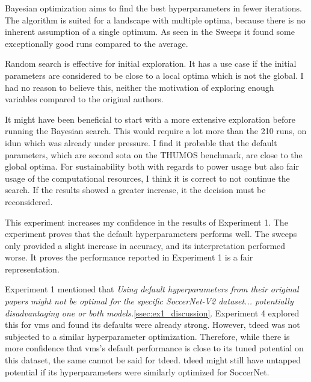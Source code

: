 Bayesian optimization aims to find the best hyperparameters in fewer iterations. The algorithm is suited for a landscape with multiple optima, because there is no inherent assumption of a single optimum. As seen in the Sweeps it found some exceptionally good runs compared to the average. 

Random search is effective for initial exploration. It has a use case if the initial parameters are considered to be close to a local optima which is not the global. I had no reason to believe this, neither the motivation of exploring enough variables compared to the original authors\cite{li_videomamba_2024}.


It might have been beneficial to start with a more extensive exploration before running the Bayesian search. This would require a lot more than the 210 runs, on \acrshort{idun} which was already under pressure. I find it probable that the default parameters, which are second \acrshort{sota} on the THUMOS benchmark, are close to the global optima. For sustainability both with regards to power usage but also fair usage of the computational resources, I think it is correct to not continue the search. If the results showed a greater increase, it the decision must be reconsidered.




This experiment increases my confidence in the results of Experiment 1. The experiment proves that the default hyperparameters performs well. The sweeps only provided a slight increase in accuracy, and its interpretation performed worse. It proves the performance reported in Experiment 1 is a fair representation.

Experiment 1 mentioned that \textit{Using default hyperparameters from their original papers might not be optimal for the specific SoccerNet-V2 dataset... potentially disadvantaging one or both models.}\autoref{ssec:ex1_discussion}. Experiment 4 explored this for \acrshort{vms} and found its defaults were already strong. However, \acrshort{tdeed} was not subjected to a similar hyperparameter optimization. Therefore, while there is more confidence that \acrshort{vms}'s default performance is close to its tuned potential on this dataset, the same cannot be said for \acrshort{tdeed}. \acrshort{tdeed} might still have untapped potential if its hyperparameters were similarly optimized for SoccerNet.



